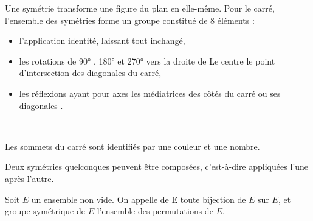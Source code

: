 \documentclass{book}
\begin{document}
\begin{Exemple}
Une symétrie transforme une figure du plan en elle-même. Pour le carré, l'ensemble des symétries forme un groupe constitué de 8 éléments :
\begin{itemize}
\item l'application identité, laissant tout inchangé, 
\item les rotations de 90° , 180° et 270° vers la droite de Le centre le point d'intersection des diagonales du carré,
\item les réflexions ayant pour axes les médiatrices des côtés du carré  ou ses diagonales .
\end{itemize}

\begin{center}
\begin{Figure}
\\
\begin{Titre}
 Les sommets du carré sont identifiés par une couleur et une nombre.
\end{Titre}
\end{Figure}
\end{center}
Deux symétries quelconques peuvent être composées, c'est-à-dire appliquées l'une après l'autre.
\end{Exemple}

\begin{Exemple} Soit $E$ un ensemble non vide. On appelle  de E toute
bijection de $E$ sur $E$, et groupe symétrique de $E$ l'ensemble des permutations de $E$.
\end{Exemple}
\end{document}
